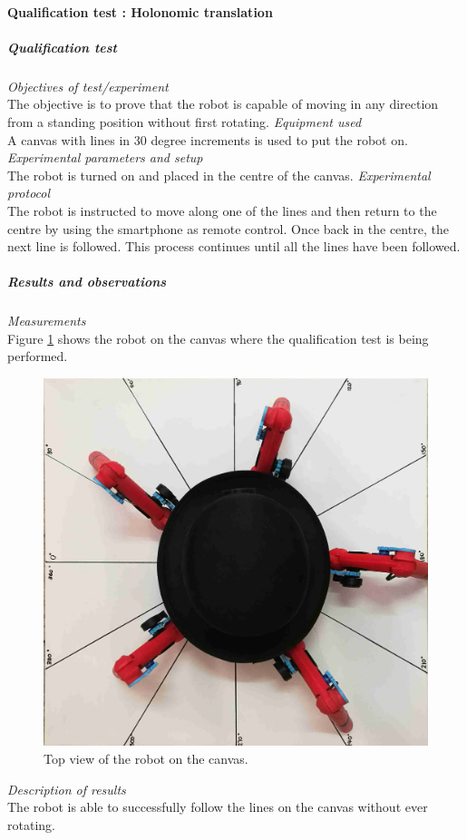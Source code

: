 \paragraph{Qualification test  : Holonomic translation}
\label{par:1}
\subparagraph{Qualification test}
\textit{Objectives of test/experiment}\\
The objective is to prove that the robot is capable of moving in any direction from a standing position without first rotating.
\textit{Equipment used}\\
A canvas with lines in 30 degree increments is used to put the robot on.
\textit{Experimental parameters and setup }\\
The robot is turned on and placed in the centre of the canvas.
\textit{Experimental protocol}\\
The robot is instructed to move along one of the lines and then return to the centre by using the smartphone as remote control. Once back in the centre, the next line is followed. This process continues until all the lines have been followed.
\subparagraph{Results and observations}
\textit{Measurements}\\
Figure \ref{fig:Res1} shows the robot on the canvas where the qualification test is being performed.
\begin{figure}[H]
\centering
\includegraphics[scale = 1]{pics/Res1.jpg}
\caption{Top view of the robot on the canvas.}
\label{fig:Res1}
\end{figure}
\textit{Description of results}\\
The robot is able to successfully follow the lines on the canvas without ever rotating.

